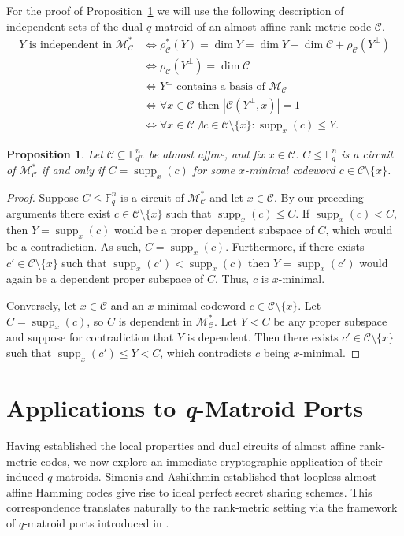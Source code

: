 \documentclass[a4paper,11pt,reqno]{article}
\newcommand{\F}{\mathbb{F}}
\newcommand{\M}{\mathcal{M}}
\newcommand{\supp}{\operatorname{supp}}
\newcommand{\C}{\mathcal{C}}
\theoremstyle{plain} \numberwithin{equation}{section}
\newtheorem{proposition}[theorem]{Proposition}
\theoremstyle{definition}
\begin{document}
For the proof of Proposition~\ref{prop:dualcircuits} we will use the following description of independent sets of the dual $q$-matroid of an almost affine rank-metric code $\C$. 
\begin{align*}
    Y \text{ is independent in } \M_\C^* &\Leftrightarrow \rho_\C^*(Y) = \dim Y = \dim Y - \dim \C + \rho_\C(Y^\perp) \\
    &\Leftrightarrow \rho_\C(Y^\perp) = \dim \C \\
    &\Leftrightarrow Y^\perp \text{ contains a basis of } \M_\C \\ 
    &\Leftrightarrow \forall x\in \C \text{ then } |\C(Y^\perp,x)|=1 \\
    &\Leftrightarrow \forall x\in \C \;\nexists c\in \C\setminus\{x\} \colon \supp_x(c)\leq Y.
\end{align*}

\begin{proposition} \label{prop:dualcircuits}
Let $\C\subseteq \F_{q^m}^n$ be almost affine, and fix $x\in \C$. $C\leq \F_q^n$ is a circuit of $\M_{\C}^*$ if and only if $C = \supp_x(c)$ for some $x$-minimal codeword $c\in \C\setminus\{x\}$.
\end{proposition}
\begin{proof}
Suppose $C\leq \F_q^n$ is a circuit of $\M_{\C}^*$ and let $x\in \C$. By our preceding arguments there exist $c\in \C\setminus \{x\}$ such that $\supp_x(c) \leq C$. If $\supp_x(c)<C$, then $Y=\supp_x(c)$ would be a proper dependent subspace of $C$, which would be a contradiction. As such, $C = \supp_x(c)$. Furthermore, if there exists $c'\in \C\setminus \{x\}$ such that $\supp_x(c')<\supp_x(c)$ then $Y = \supp_x(c')$ would again be a dependent proper subspace of $C$. Thus, $c$ is $x$-minimal.

Conversely, let $x\in \C$ and an $x$-minimal codeword $c\in \C\setminus\{x\}$. Let $C=\supp_x(c)$, so $C$ is dependent in $\M_\C^*$. Let $Y<C$ be any proper subspace and suppose for contradiction that $Y$ is dependent. Then there exists $c'\in \C\setminus\{x\}$ such that $\supp_x(c')\leq Y < C$, which contradicts $c$ being $x$-minimal.
\end{proof}

\section{Applications to \emph{q}-Matroid Ports} \label{sec:applicatons}

Having established the local properties and dual circuits of almost affine rank-metric codes, we now explore an immediate cryptographic application of their induced $q$-matroids. Simonis and Ashikhmin \cite{AlmostAffineCodes} established that loopless almost affine Hamming codes give rise to ideal perfect secret sharing schemes. This correspondence translates naturally to the rank-metric setting via the framework of $q$-matroid ports introduced in \cite{qPorts1,qPorts2}.
\end{document}
